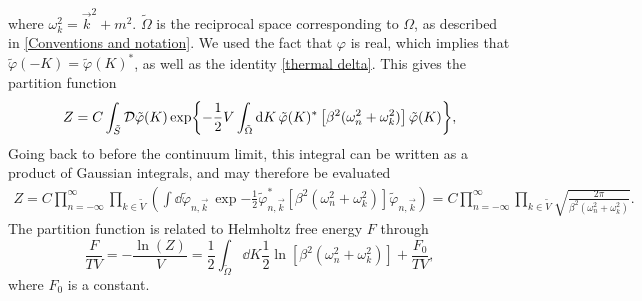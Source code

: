 where $\omega_k^2 = \vec k^2 + m^2$.
$\tilde \Omega$ is the reciprocal space corresponding to $\Omega$, as described in \autoref{Conventions and notation}.
We used the fact that $\varphi$ is real, which implies that $\tilde \varphi(-K) = \tilde \varphi(K)^*$, as well as the identity \autoref{thermal delta}.
This gives the partition function 
\begin{equation*}
    Z = C \int_{\tilde S} \mathcal{D} \tilde \varphi(K) 
    \exp{
        -  \frac{1}{2} V \int_{\tilde \Omega} \dd K \, 
        \tilde \varphi(K)^* \left[\beta^2 (\omega_n^2+ \omega_k^2)\right] \tilde \varphi(K)
    },
\end{equation*}
Going back to before the continuum limit, this integral can be written as a product of Gaussian integrals, and may therefore be evaluated
\begin{align*}
    Z = C \prod_{n=-\infty}^\infty \prod_{k \in \tilde V}
    \left(
        \int \dd \tilde \varphi_{n, \vec k} \,
        \exp{
            - \frac{1}{2} \tilde \varphi_{n, \vec k}^*
            \left[\beta^2 (\omega_n^2+ \omega_k^2)\right] 
            \tilde \varphi_{n, \vec k}
            }
    \right)
    = 
    C \prod_{n=-\infty}^\infty \prod_{k \in \tilde V} 
    \sqrt{\frac{2 \pi}{\beta^2 (\omega_n^2 + \omega_k^2)}}.
\end{align*}
The partition function is related to Helmholtz free energy $F$ through
\begin{equation*}
    \frac{F}{T V}= - \frac{\ln(Z)}{V} = \frac{1}{2} \int_{\tilde \Omega} \dd K \frac{1}{2} \ln[\beta^2(\omega_n^2 + \omega_k^2)] + \frac{F_0}{TV},
\end{equation*}
where $F_0$ is a constant.

